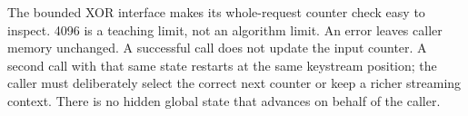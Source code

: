 The bounded XOR interface makes its whole-request counter check easy to inspect.
4096 is a teaching limit, not an algorithm limit. An error leaves caller memory
unchanged. A successful call does not update the input counter. A second call with
that same state restarts at the same keystream position; the caller must deliberately
select the correct next counter or keep a richer streaming context. There is no
hidden global state that advances on behalf of the caller.
